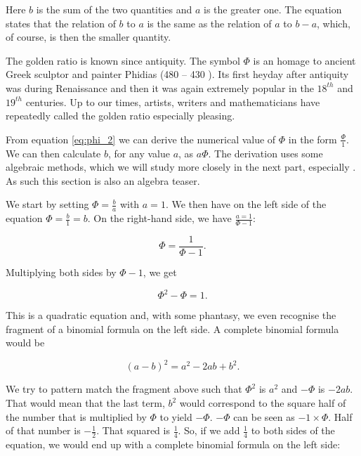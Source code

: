 \documentclass[tikz]{scrreprt}
\begin{document}
Here $b$ is the sum of the two quantities
and $a$ is the greater one.
The equation states that the relation
of $b$ to $a$ is the same as the relation
of $a$ to $b-a$, which, of course, is
then the smaller quantity.

The golden ratio is known since antiquity.
The symbol $\Phi$ is an homage to ancient Greek
sculptor and painter Phidias (480 -- 430 ).
Its first heyday after antiquity was
during Renaissance and then it was again
extremely popular in the $18^{th}$ and $19^{th}$ centuries.
Up to our times, artists, writers and mathematicians 
have repeatedly called the golden ratio 
especially pleasing. 

From equation \ref{eq:phi_2} we can derive
the numerical value of $\Phi$ in the form
$\frac{\Phi}{1}$.
We can then calculate $b$,
for any value $a$,
as $a\Phi$.
The derivation uses some algebraic methods,
which we will study more closely in the next part,
especially .
As such this section is also an algebra teaser.

We start by setting $\Phi = \frac{b}{a}$
with $a = 1$.
We then have on the left side of the equation
$\Phi = \frac{b}{1} = b$.
On the right-hand side, we have
$\frac{a=1}{\Phi - 1}$:

\begin{equation}
\Phi = \frac{1}{\Phi - 1}.
\end{equation}

Multiplying both sides by $\Phi - 1$,
we get 

\begin{equation}
\Phi^2 - \Phi = 1.
\end{equation}

This is a quadratic equation and,
with some phantasy, we even
recognise the fragment of a binomial formula on the
left side. A complete binomial formula would be

\begin{equation}
(a-b)^2 = a^2-2ab+b^2.
\end{equation}

We try to pattern match the fragment above
such that $\Phi^2$ is $a^2$ and $-\Phi$
is $-2ab$. That would mean that the last term,
$b^2$ would correspond to the square half of the number
that is multiplied by $\Phi$ to yield $-\Phi$.
$-\Phi$ can be seen as $-1 \times \Phi$.
Half of that number is $-\frac{1}{2}$.
That squared is $\frac{1}{4}$.
So, if we add $\frac{1}{4}$ to both sides of the equation,
we would end up with a complete binomial formula on 
the left side:
\end{document}

